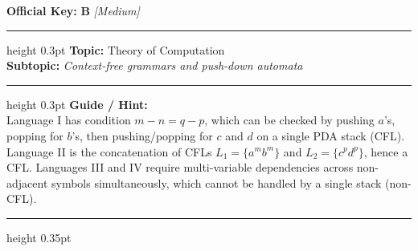 \documentclass[a4paper,10pt]{article}
\begin{document}
\begin{tcolorbox}
\textbf{Official Key:} \textbf{\large B} \hfill \textit{\small [Medium]}
\vspace{2pt}\hrule height 0.3pt\vspace{3pt}
\textbf{Topic:} Theory of Computation \\
\textbf{Subtopic:} \textit{Context-free grammars and push-down automata}
\vspace{2pt}\hrule height 0.3pt\vspace{3pt}
\textbf{Guide / Hint:} \\
{\small Language I has condition $m - n = q - p$, which can be checked by pushing $a$'s, popping for $b$'s, then pushing/popping for $c$ and $d$ on a single PDA stack (CFL). Language II is the concatenation of CFLs $L_1 = \{a^m b^m\}$ and $L_2 = \{c^p d^p\}$, hence a CFL. Languages III and IV require multi-variable dependencies across non-adjacent symbols simultaneously, which cannot be handled by a single stack (non-CFL).}

\end{tcolorbox}
\vspace{6pt}\hrule height 0.35pt\vspace{6pt}
\noindent
\end{document}
